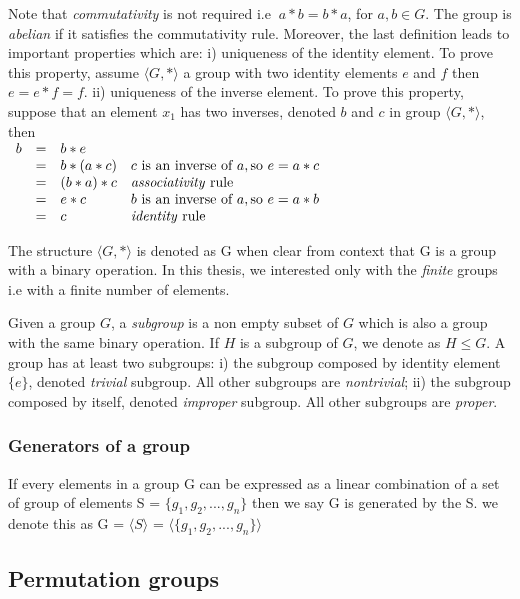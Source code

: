 Note that \emph{commutativity} is not required i.e $\ a * b = b * a$, for $a, b \in G$.
The group is \emph{abelian} if it satisfies the commutativity rule.
Moreover, the last definition leads to important properties which are: i) uniqueness of the identity element. 
To prove this property, assume $\langle G, * \rangle$ a group with two identity elements $e$ and $f$ 
then $ e = e * f = f$.
ii) uniqueness of the inverse element. To prove this property, suppose that an element $x_1$ has two inverses,
denoted $b$ and $c$ in group $\langle G, * \rangle$, then\\
$\begin{array}{lcll}					
b & = & b * e & \\
& = & b * (a * c) & c \text{ is an inverse of } a, \text{so } e = a * c\\
& = & (b * a) * c &   \text{\emph{associativity} rule}\\
& = & e * c       & b \text{ is an inverse of } a, \text{so } e = a * b\\
& = & c           &   \text{\emph{identity} rule}
\end{array}$

The structure $\langle G, * \rangle$ is denoted as G when clear from context that G is a group
with a binary operation. In this thesis, we interested only with the \emph{finite} groups i.e
with a finite number of elements.

Given a group $G$, a \emph{subgroup} is a non empty subset of $G$ which is also a group with 
the same binary operation. If $H$ is a subgroup of $G$, we denote as $H \leq G$.
A group has at least two subgroups: i) the subgroup composed by identity element $\{e\}$, denoted \emph{trivial} subgroup. All other subgroups are \emph{nontrivial}; ii) the subgroup composed by itself, denoted \emph{improper} subgroup. All other subgroups are \emph{proper}.


\subsubsection{Generators of a group}

If every elements in a group G can be expressed as a linear combination
of a set of group of elements S = $\{g_1, g_2, ..., g_n \}$ then we say G is 
generated by the S. we denote this as G = $\langle S \rangle$ =
$\langle \{g_1, g_2, ..., g_n \} \rangle$ 



\subsection{Permutation groups}

